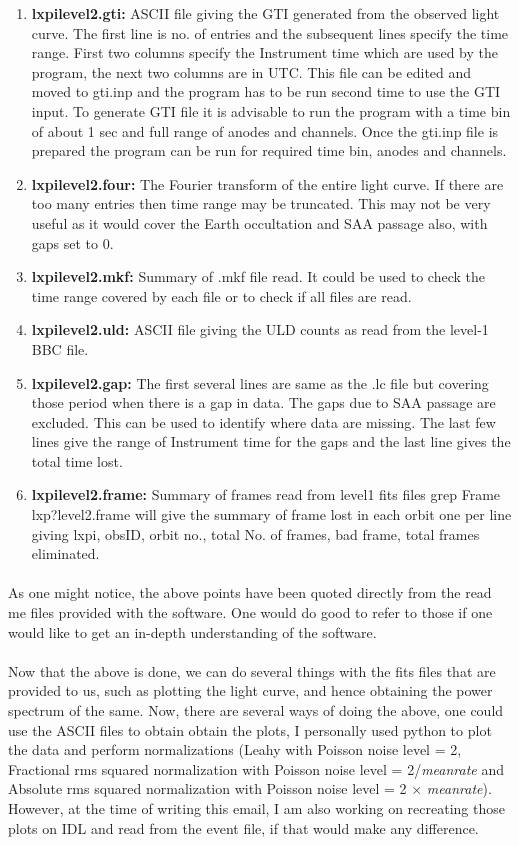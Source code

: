 \documentclass[a4paper,twoside]{report}
\numberwithin{equation}{section}
\begin{document}
\begin{enumerate}
\item \textbf{lxpilevel2.gti:} ASCII file giving the GTI generated from the observed light curve.  The first line is no. of entries and the subsequent lines specify the time range. First two columns specify the Instrument time which are used by the program, the next two columns are in UTC. This file can be edited and moved to gti.inp and the program has to be run second time to use the GTI input. To generate GTI file it is advisable to run the program with a time bin of about 1 sec and full range of anodes and channels. Once the gti.inp file is prepared the program can be run for required time bin, anodes and channels.
\item \textbf{lxpilevel2.four:} The Fourier transform of the entire light curve. If there are too many entries then time range  may be truncated. This may not be very useful as it would cover the Earth occultation and SAA passage also, with gaps set to 0.
\item \textbf{lxpilevel2.mkf:} Summary of .mkf file read. It could be used to check the time range covered by each file or to check if all files are read.
\item \textbf{lxpilevel2.uld:} ASCII file giving the ULD counts as read from the level-1 BBC file.
\item \textbf{lxpilevel2.gap:} The first several lines are same as the .lc file but covering those period when there is a gap in data. The gaps due to SAA passage are excluded. This can be used to identify where data are missing. The last few lines give the range of Instrument time for the gaps and the last line gives the total time lost.
\item \textbf{lxpilevel2.frame:} Summary of frames read from level1 fits files grep Frame lxp?level2.frame will give the summary of frame lost in each orbit one per line giving lxpi, obsID, orbit no., total No. of frames, bad frame, total frames eliminated.
\end{enumerate}
\paragraph{}
As one might notice, the above points have been quoted directly from the read me files provided with the software. One would do good to refer to those if one would like to get an in-depth understanding of the software. 
\paragraph{}
Now that the above is done, we can do several things with the fits files that are provided to us, such as plotting the light curve, and hence obtaining the power spectrum of the same. Now, there are several ways of doing the above, one could use the ASCII files to obtain obtain the plots, I personally used python to plot the data and perform normalizations (Leahy with Poisson noise level = 2, Fractional rms squared normalization with Poisson noise level = 2/\textit{meanrate} and  Absolute rms squared normalization with Poisson noise level = 2 $\times$ \textit{meanrate}). However, at the time of writing this email, I am also working on recreating those plots on IDL and read from the event file, if that would make any difference. 
\end{document}
